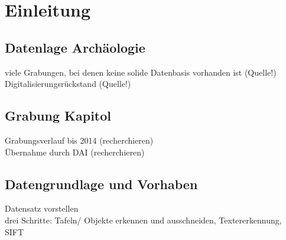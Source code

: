 \section{Einleitung}

\subsection{Datenlage Archäologie}
viele Grabungen, bei denen keine solide Datenbasis vorhanden ist (Quelle!)\\
Digitalisierungsrückstand (Quelle!)\\

\subsection{Grabung Kapitol}
Grabungsverlauf bis 2014 (recherchieren)\\
Übernahme durch DAI (recherchieren)\\

\subsection{Datengrundlage und Vorhaben}
Datensatz vorstellen\\
drei Schritte: Tafeln/ Objekte erkennen und ausschneiden, Textererkennung, SIFT\\
